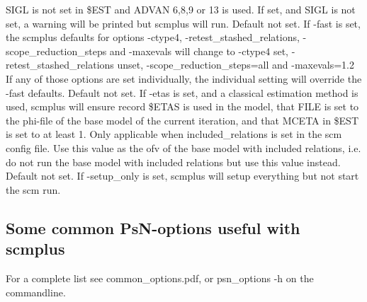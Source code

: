 \documentclass[hideglossary,notoc,hidelof,hidelot,hideTheSignaturePage,hideLinkCurrent,hideloa,pdfLatex,noClient,notitle,hideConfidential]{PMXstyle-20170118kajsa4}
\begin{document}
\begin{optionlist}
SIGL is not set in \$EST and ADVAN 6,8,9 or 13 is used.
If set, and SIGL is not set, a warning will be printed but scmplus will run.
\nextopt
{}
Default not set. 
If -fast is set, the scmplus defaults for options -ctype4, -retest\_stashed\_relations,
-scope\_reduction\_steps and -maxevals will change to -ctype4 set, 
-retest\_stashed\_relations unset, -scope\_reduction\_steps=all and -maxevals=1.2\\ 
If any of those options are set individually, the individual setting will override the
-fast defaults.
\nextopt
{}
Default not set. 
If -etas is set, and a classical estimation method is used, scmplus will ensure record \$ETAS is used
in the model, that FILE is set to the phi-file of the base model of the current iteration,
and that MCETA in \$EST is set to at least 1.
\nextopt
{}
Only applicable when included\_relations is set in the scm config file.
Use this value as the ofv of the base model with included relations,
i.e. do not run the base model with included relations but use
this value instead.
\nextopt
{}
Default not set. 
If -setup\_only is set, scmplus will setup everything but not start the scm run.
\nextopt
\end{optionlist}

\subsection{Some common PsN-options useful with scmplus}
For a complete list see common\_options.pdf, or psn\_options -h on the commandline.


\end{document}
